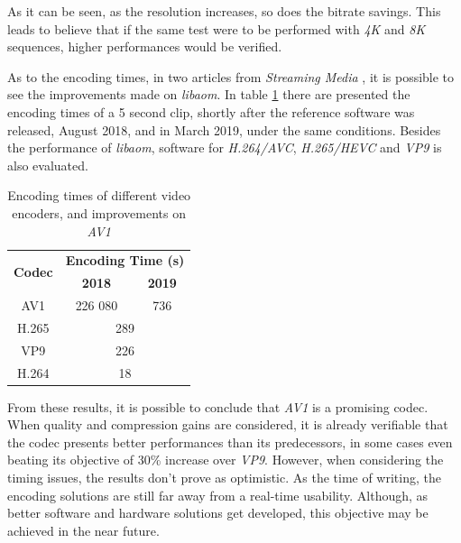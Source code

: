 As it can be seen, as the resolution increases, so does the bitrate savings. This leads to believe that if the same test were to be performed with \emph{4K} and \emph{8K} sequences, higher performances would be verified.

As to the encoding times, in two articles from \emph{Streaming Media} \cite{AV1FirstLook2018, GoodNewsAV12019}, it is possible to see the improvements made on \emph{libaom}. In table \ref{tab:testtime} there are presented the encoding times of a 5 second clip, shortly after the reference software was released, August 2018, and in March 2019, under the same conditions. Besides the performance of \emph{libaom}, software for \emph{H.264/AVC}, \emph{H.265/HEVC} and \emph{VP9} is also evaluated.

\begin{table}[h]
    \centering
    \begin{tabular}{@{}ccc@{}} \toprule
        \multirow{2}{*}{\textbf{Codec}}     &      \multicolumn{2}{c}{\textbf{Encoding Time (s)}} \\
         &    \textbf{2018}  &   \textbf{2019}  \\ \toprule
        AV1            &    226 080        & 736 \\
        H.265          &    \multicolumn{2}{c}{289} \\
        VP9            &    \multicolumn{2}{c}{226} \\
        H.264          &    \multicolumn{2}{c}{18} \\
        \bottomrule
    \end{tabular}
    \caption{Encoding times of different video encoders, and improvements on \emph{AV1}}
    \label{tab:testtime}
\end{table}

From these results, it is possible to conclude that \emph{AV1} is a promising codec. When quality and compression gains are considered, it is already verifiable that the codec presents better performances than its predecessors, in some cases even beating its objective of 30\% increase over \emph{VP9}. However, when considering the timing issues, the results don't prove as optimistic. As the time of writing, the encoding solutions are still far away from a real-time usability. Although, as better software and hardware solutions get developed, this objective may be achieved in the near future.


\clearpage
\printbibliography[heading=subbibliography]
